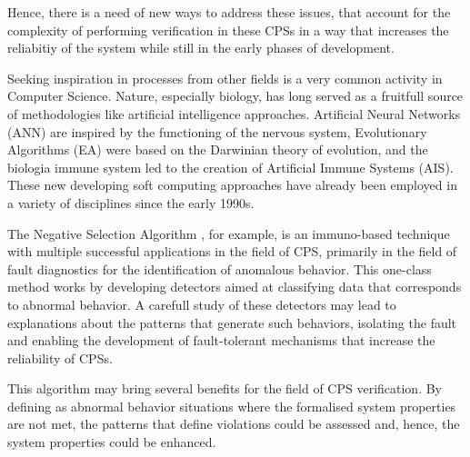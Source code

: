 Hence, there is a need of new ways to address these issues, that account for the complexity of performing verification in these CPSs in a way that increases the reliabitiy of the system while still in the early phases of development.

Seeking inspiration in processes from other fields is a very common activity in Computer Science. Nature, especially biology, has long served as a fruitfull source of methodologies like artificial intelligence approaches. Artificial Neural Networks (ANN) are inspired by the functioning of the nervous system, Evolutionary Algorithms (EA) were based on the Darwinian theory of evolution, and the biologia immune system led to the creation of Artificial Immune Systems (AIS). These new developing soft computing approaches have already been employed in a variety of disciplines since the early 1990s. 

The Negative Selection Algorithm \cite{ICBook2009}, for example, is an immuno-based technique with multiple successful applications in the field of CPS, primarily in the field of fault diagnostics for the identification of anomalous behavior. This one-class method works by developing detectors aimed at classifying data that corresponds to abnormal behavior. A carefull study of these detectors may lead to explanations about the patterns that generate such behaviors, isolating the fault and enabling the development of fault-tolerant mechanisms that increase the reliability of CPSs. 

This algorithm may bring several benefits for the field of CPS verification. By defining as abnormal behavior situations where the formalised system properties are not met, the patterns that define violations could be assessed and, hence, the system properties could be enhanced. 

